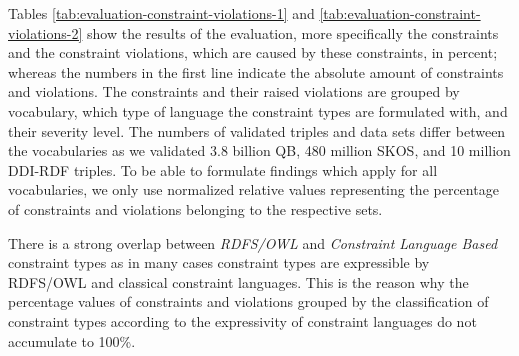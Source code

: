 \documentclass[conference]{IEEEtran}
\newcommand{\ke}[1]{\todo[size=\small, color=red!40]{\textbf{Kai:} #1}}
\newcommand{\tb}[1]{\todo[size=\small, color=green!40]{\textbf{Thomas:} #1}}
\begin{document}
Tables \ref{tab:evaluation-constraint-violations-1} and \ref{tab:evaluation-constraint-violations-2} show the results of the evaluation, more specifically the constraints and the constraint violations, which are caused by these constraints, in percent; whereas the numbers in the first line indicate the absolute amount of constraints and violations. The constraints and their raised violations are grouped by vocabulary, which type of language the constraint types are formulated with, and their severity level.
The numbers of validated triples and data sets differ between the vocabularies
as we validated 3.8 billion QB, 480 million SKOS, and 10 million DDI-RDF triples.
To be able to formulate findings which apply for all vocabularies, 
we only use normalized relative values representing the percentage of constraints and violations belonging to the respective sets. 

There is a strong overlap between \emph{RDFS/OWL} and \emph{Constraint Language Based} constraint types as in many cases constraint types are expressible by RDFS/OWL and classical constraint languages. This is the reason why the percentage values of constraints and violations grouped by the classification of constraint types according to the expressivity of constraint languages do not accumulate to 100\%. 


\end{document}
